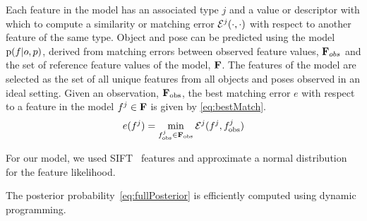             Each feature in the model has an associated type $j$ and a value or descriptor with which to compute a similarity or matching error $\mathcal{E}^j(\cdot,\cdot)$ with respect to another feature of the same type. Object and pose can be predicted using the model $\text{p}(f|o,p)$, derived from matching errors between observed feature values, $\mathbf{F}_{obs}$ and the set of reference feature values of the model, $\mathbf{F}$. The features of the model are selected as the set of all unique features from all objects and poses observed in an ideal setting. Given an observation, $\mathbf{F}_{\text{obs}}$, the best matching error $e$ with respect to a feature in the model $f^j \in \mathbf{F}$ is given by \eqref{eq:bestMatch}.
            \begin{equation}
                \label{eq:bestMatch}
                e(f^j) = \min_{f^j_{\text{obs}} \in \set{F}_{\text{obs}}}\cursive{E}^j(f^j,f^j_{\text{obs}})
            \end{equation}
            

            For our model, we used SIFT~\cite{lowe2004distinctive} features and approximate a normal distribution for the feature likelihood.   

            The posterior probability~\eqref{eq:fullPosterior} is efficiently computed using dynamic programming.
            


